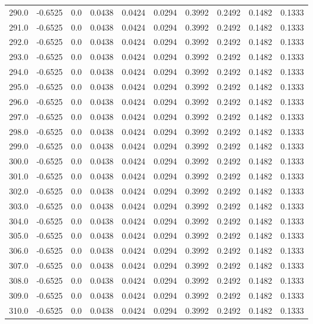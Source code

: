 \begin{longtable}{lrrrrrrrrr}
290.0 & -0.6525 & 0.0 & 0.0438 & 0.0424 & 0.0294 & 0.3992 & 0.2492 & 0.1482 & 0.1333 \\
291.0 & -0.6525 & 0.0 & 0.0438 & 0.0424 & 0.0294 & 0.3992 & 0.2492 & 0.1482 & 0.1333 \\
292.0 & -0.6525 & 0.0 & 0.0438 & 0.0424 & 0.0294 & 0.3992 & 0.2492 & 0.1482 & 0.1333 \\
293.0 & -0.6525 & 0.0 & 0.0438 & 0.0424 & 0.0294 & 0.3992 & 0.2492 & 0.1482 & 0.1333 \\
294.0 & -0.6525 & 0.0 & 0.0438 & 0.0424 & 0.0294 & 0.3992 & 0.2492 & 0.1482 & 0.1333 \\
295.0 & -0.6525 & 0.0 & 0.0438 & 0.0424 & 0.0294 & 0.3992 & 0.2492 & 0.1482 & 0.1333 \\
296.0 & -0.6525 & 0.0 & 0.0438 & 0.0424 & 0.0294 & 0.3992 & 0.2492 & 0.1482 & 0.1333 \\
297.0 & -0.6525 & 0.0 & 0.0438 & 0.0424 & 0.0294 & 0.3992 & 0.2492 & 0.1482 & 0.1333 \\
298.0 & -0.6525 & 0.0 & 0.0438 & 0.0424 & 0.0294 & 0.3992 & 0.2492 & 0.1482 & 0.1333 \\
299.0 & -0.6525 & 0.0 & 0.0438 & 0.0424 & 0.0294 & 0.3992 & 0.2492 & 0.1482 & 0.1333 \\
300.0 & -0.6525 & 0.0 & 0.0438 & 0.0424 & 0.0294 & 0.3992 & 0.2492 & 0.1482 & 0.1333 \\
301.0 & -0.6525 & 0.0 & 0.0438 & 0.0424 & 0.0294 & 0.3992 & 0.2492 & 0.1482 & 0.1333 \\
302.0 & -0.6525 & 0.0 & 0.0438 & 0.0424 & 0.0294 & 0.3992 & 0.2492 & 0.1482 & 0.1333 \\
303.0 & -0.6525 & 0.0 & 0.0438 & 0.0424 & 0.0294 & 0.3992 & 0.2492 & 0.1482 & 0.1333 \\
304.0 & -0.6525 & 0.0 & 0.0438 & 0.0424 & 0.0294 & 0.3992 & 0.2492 & 0.1482 & 0.1333 \\
305.0 & -0.6525 & 0.0 & 0.0438 & 0.0424 & 0.0294 & 0.3992 & 0.2492 & 0.1482 & 0.1333 \\
306.0 & -0.6525 & 0.0 & 0.0438 & 0.0424 & 0.0294 & 0.3992 & 0.2492 & 0.1482 & 0.1333 \\
307.0 & -0.6525 & 0.0 & 0.0438 & 0.0424 & 0.0294 & 0.3992 & 0.2492 & 0.1482 & 0.1333 \\
308.0 & -0.6525 & 0.0 & 0.0438 & 0.0424 & 0.0294 & 0.3992 & 0.2492 & 0.1482 & 0.1333 \\
309.0 & -0.6525 & 0.0 & 0.0438 & 0.0424 & 0.0294 & 0.3992 & 0.2492 & 0.1482 & 0.1333 \\
310.0 & -0.6525 & 0.0 & 0.0438 & 0.0424 & 0.0294 & 0.3992 & 0.2492 & 0.1482 & 0.1333 \\

\end{longtable}
